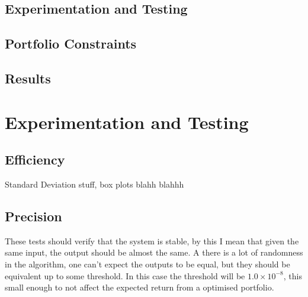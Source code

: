 \documentclass{pdfmx4020}
\begin{document}
  \section{Experimentation and Testing} %
  \label{sec:experimentation_and_testing}
  

  \section{Portfolio Constraints} %
  \label{sec:portfolio_constraints}
  

  \section{Results} %
  \label{sec:results}
  


\chapter{Experimentation and Testing}

  \section{Efficiency} %
  \label{sec:efficiency}
    Standard Deviation stuff, box plots blahh blahhh

  \section{Precision} %
  \label{sec:precision}
  These tests should verify that the system is stable, by this I mean that given the same input, the output should be almost the same. A there is a lot of randomness in the algorithm, one can't expect the outputs to be equal, but they should be equivalent up to some threshold. In this case the threshold will be $1.0\times10^{-8}$, this small enough to not affect the expected return from a optimised portfolio.
\end{document}
